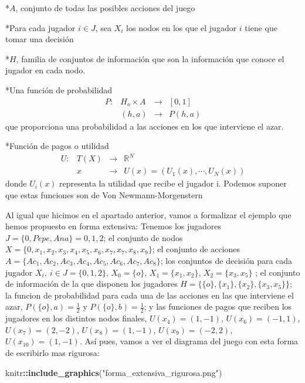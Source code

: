 \documentclass[12pt,a4paper,]{book}
\newenvironment{Shaded}{\begin{snugshade}}{\end{snugshade}}
\newcommand{\FunctionTok}[1]{\textcolor[rgb]{0.13,0.29,0.53}{\textbf{#1}}}
\newcommand{\NormalTok}[1]{#1}
\newcommand{\SpecialCharTok}[1]{\textcolor[rgb]{0.81,0.36,0.00}{\textbf{#1}}}
\newcommand{\StringTok}[1]{\textcolor[rgb]{0.31,0.60,0.02}{#1}}
\numberwithin{dummy}{section}
\theoremstyle{ocrenumbox}
\theoremstyle{blacknumex}
\theoremstyle{blacknumbox}
\theoremstyle{ocrenum}
\theoremstyle{ocrenum}
\begin{document}
*\(A\), conjunto de todas las posibles acciones del juego

*Para cada jugador \(i \in J\), sea \(X_i\) los nodos en los que el
jugador \(i\) tiene que tomar una decisión

*\(H\), familia de conjuntos de información que son la información que
conoce el jugador en cada nodo.

*Una función de probabilidad \[
\begin{array}{cccc}
P : & H_o \times A & \rightarrow & [0,1] \\
   &  (h,a) & \rightarrow   & P(h,a)
\end{array}
\] que proporciona una probabilidad a las acciones en los que interviene
el azar.

*Función de pagos o utilidad \[
\begin{array}{cccc}
U: & T(X) & \rightarrow & \mathbb{R}^N \\
   &  x & \rightarrow   & U(x)=(U_1(x),\cdots,U_N(x))
\end{array}
\] donde \(U_i(x)\) representa la utilidad que recibe el jugador i.
Podemos suponer que estas funciones son de Von Newmann-Morgenstern

Al igual que hicimos en el apartado anterior, vamos a formalizar el
ejemplo que hemos propuesto en forma extensiva: Tenemos los jugadores
\(J=\{0, Pepe, Ana\} = {0,1,2}\); el conjunto de nodos
\(X=\{0,x_1,x_2,x_3,x_4,x_5,x_6,x_7,x_7,x_8,x_9 \}\); el conjunto de
acciones \(A=\{Ac_1,Ac_2,Ac_3,Ac_4,Ac_5,Ac_6,Ac_7,Ac_8 \}\); los
conjuntos de decisión para cada jugador \(X_i, \ i \in J=\{0,1,2\}\),
\(X_0=\{o \}\), \(X_1=\{x_1,x_2 \}\), \(X_2= \{x_3,x_5 \}\) ; el
conjunto de información de la que disponen los jugadores
\(H=\{ \{o\}, \{x_1\},\{x_2\}, \{x_3,x_5\} \}\); la funcion de
probabilidad para cada una de las acciones en las que interviene el
azar, \(P(\{o\},a)=\frac{1}{2}\) y \(P(\{o\},b)=\frac{1}{2}\); y las
funciones de pagos que reciben los jugadores en los distintos nodos
finales, \(U(x_4)=(1,-1)\), \(U(x_6)=(-1,1)\), \(U(x_7)=(2,-2)\),
\(U(x_8)=(1,-1)\), \(U(x_9)=(-2,2)\), \(U(x_10)=(1,-1)\). Así pues,
vamos a ver el diagrama del juego con esta forma de escribirlo mas
rigurosa:

\begin{Shaded}
\begin{Highlighting}[]
\NormalTok{knitr}\SpecialCharTok{::}\FunctionTok{include\_graphics}\NormalTok{(}\StringTok{"forma\_extensiva\_rigurosa.png"}\NormalTok{)}
\end{Highlighting}
\end{Shaded}
\end{document}
